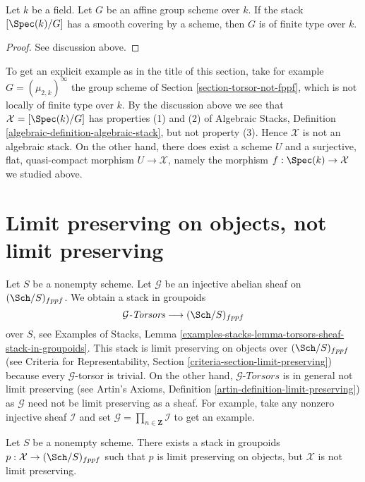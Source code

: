 \begin{lemma}
\label{lemma-BG-algebraic}
Let $k$ be a field. Let $G$ be an affine group scheme over $k$.
If the stack $[\Spec(k)/G]$ has a smooth covering by a
scheme, then $G$ is of finite type over $k$.
\end{lemma}

\begin{proof}
See discussion above.
\end{proof}

\noindent
To get an explicit example as in the title of this section, take for example
$G = (\mu_{2, k})^\infty$ the group scheme of
Section \ref{section-torsor-not-fppf}, which is not locally of finite type
over $k$. By the discussion above we see that
$\mathcal{X} = [\Spec(k)/G]$ has properties (1) and (2) of
Algebraic Stacks, Definition \ref{algebraic-definition-algebraic-stack},
but not property (3). Hence $\mathcal{X}$ is not an algebraic stack.
On the other hand, there does exist a scheme $U$ and a surjective,
flat, quasi-compact morphism $U \to \mathcal{X}$, namely the morphism
$f : \Spec(k) \to \mathcal{X}$ we studied above.






\section{Limit preserving on objects, not limit preserving}
\label{section-limit-preserving}

\noindent
Let $S$ be a nonempty scheme. Let $\mathcal{G}$ be an injective abelian sheaf
on $(\Sch/S)_{fppf}$. We obtain a stack in groupoids
$$
\mathcal{G}\textit{-Torsors} \longrightarrow (\Sch/S)_{fppf}
$$
over $S$, see Examples of Stacks, Lemma
\ref{examples-stacks-lemma-torsors-sheaf-stack-in-groupoids}.
This stack is limit preserving on objects over $(\Sch/S)_{fppf}$ (see
Criteria for Representability, Section \ref{criteria-section-limit-preserving})
because every $\mathcal{G}$-torsor is trivial. On the other hand,
$\mathcal{G}\textit{-Torsors}$ is in general not limit preserving (see
Artin's Axioms, Definition \ref{artin-definition-limit-preserving})
as $\mathcal{G}$ need not be limit preserving as a sheaf. For example,
take any nonzero injective sheaf $\mathcal{I}$ and set
$\mathcal{G} = \prod_{n \in \mathbf{Z}} \mathcal{I}$ to get an
example.

\begin{lemma}
\label{lemma-limit-preserving-on-objects-not-limit-preserving}
Let $S$ be a nonempty scheme. There exists a stack in groupoids
$p : \mathcal{X} \to (\Sch/S)_{fppf}$
such that $p$ is limit preserving on objects, but $\mathcal{X}$ is not
limit preserving.
\end{lemma}

